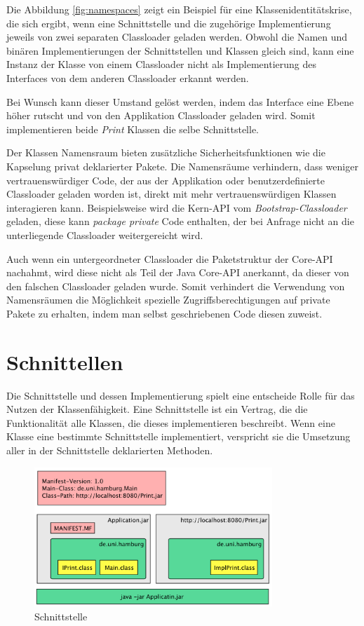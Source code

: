     Die Abbildung \ref{fig:namespaces} zeigt ein Beispiel für eine Klassenidentitätskrise, die sich ergibt, wenn eine Schnittstelle und die zugehörige Implementierung jeweils von zwei separaten Classloader geladen werden. Obwohl die Namen und binären Implementierungen der Schnittstellen und Klassen gleich sind, kann eine Instanz der Klasse von einem Classloader nicht als Implementierung des Interfaces von dem anderen Classloader erkannt werden.

    Bei Wunsch kann dieser Umstand gelöst werden, indem das Interface eine Ebene höher rutscht und von den Applikation Classloader geladen wird. Somit implementieren beide \textit{Print} Klassen die selbe Schnittstelle.\bigbreak 

    Der Klassen Namensraum bieten zusätzliche Sicherheitsfunktionen wie die Kapselung privat deklarierter Pakete. Die Namensräume verhindern, dass weniger vertrauenswürdiger Code, der aus der Applikation oder benutzerdefinierte Classloader geladen worden ist, direkt mit mehr vertrauenswürdigen Klassen interagieren kann. Beispielsweise wird die Kern-API vom \textit{Bootstrap-Classloader} geladen, diese kann \textit{package private} Code enthalten, der bei Anfrage nicht an die unterliegende Classloader weitergereicht wird.

    Auch wenn ein untergeordneter Classloader die Paketstruktur der Core-API nachahmt, wird diese nicht als Teil der Java Core-API anerkannt, da dieser von den falschen Classloader geladen wurde. Somit verhindert die Verwendung von Namensräumen die Möglichkeit spezielle Zugriffsberechtigungen auf private Pakete zu erhalten, indem man selbst geschriebenen Code diesen zuweist.

\section{Schnittellen} \label{sub:Kapselung}
  Die Schnittstelle und dessen Implementierung spielt eine entscheide Rolle für das Nutzen der Klassenfähigkeit. Eine Schnittstelle ist ein Vertrag, die die Funktionalität alle Klassen, die dieses implementieren beschreibt. Wenn eine Klasse eine bestimmte Schnittstelle implementiert, verspricht sie die Umsetzung aller in der Schnittstelle deklarierten Methoden.

  \begin{figure}[h!]
    \centering
    \includegraphics[width=0.8\textwidth]{material/images/Interface.png}
    \caption{Schnittstelle}
    \label{fig:Schnittstelle}
  \end{figure}

